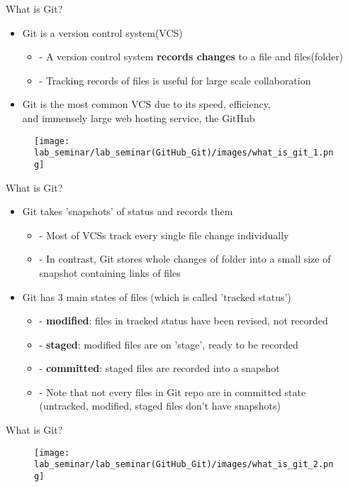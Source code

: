 \documentclass[11pt, xelatex]{beamer}
\newcommand{\bi}{\begin{itemize}}
\newcommand{\ei}{\end{itemize}}
\begin{document}
\begin{frame}{What is Git?}
\bi
\item Git is a version control system(VCS)
    \bi
    \item[-] A version control system \textbf{records changes} to a file and files(folder)
    \item[-] Tracking records of files is useful for large scale collaboration
    \ei
\item Git is the most common VCS due to its speed, efficiency,\\and immensely large web hosting service, the GitHub
\ei
\begin{figure}
	\texttt{[image: lab\_seminar/lab\_seminar(GitHub\_Git)/images/what\_is\_git\_1.png]}
\end{figure}
\end{frame}

\begin{frame}{What is Git?}
\bi
\item Git takes 'snapshots' of status and records them
    \bi
    \item[-] Most of VCSs track every single file change individually
    \item[-] In contrast, Git stores whole changes of folder into a small size of snapshot containing links of files
    \ei
\item Git has 3 main states of files (which is called 'tracked status')
    \bi
    \item[-] \textbf{modified}: files in tracked status have been revised, not recorded
    \item[-] \textbf{staged}: modified files are on 'stage', ready to be recorded
    \item[-] \textbf{committed}: staged files are recorded into a snapshot \textbf{\color{red}{with checkpoint}}
    \item[-] Note that not every files in Git repo are in committed state\\
    (untracked, modified, staged files don't have snapshots)
    \ei
\ei
\end{frame}

\begin{frame}{What is Git?}
\begin{figure}
	\texttt{[image: lab\_seminar/lab\_seminar(GitHub\_Git)/images/what\_is\_git\_2.png]}
\end{figure}
\end{frame}
\end{document}
